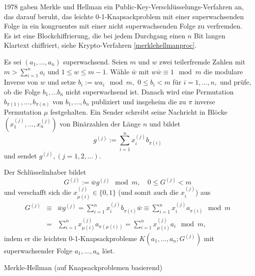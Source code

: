 \begin{refsegment}
1978 gaben Merkle und Hellman \cite{Merkle1978}  ein Public-Key-Verschlüsselungs-Verfahren an, das darauf beruht, das leichte 0-1-Knapsackproblem mit einer superwachsenden Folge in ein kongruentes mit einer nicht superwachsenden Folge zu \glqq verfremden\grqq. Es ist eine Blockchiffrierung, die bei jedem Durchgang einen $n$ Bit langen Klartext chiffriert, siehe Krypto-Verfahren \ref{merklehellmanproc}.

\begin{cryptoprocedure}
Es sei $ (a_1, \dots, a_n) $ superwachsend. Seien $ m $ und $ w $ zwei
teilerfremde Zahlen mit $ m >
\sum_{i=1}^{n} a_i $ und $ 1\leq w \leq m-1. $
Wähle $\bar{w} $ mit $ w \bar{w} \equiv 1 \mod m $ die modulare Inverse
von $ w $ und setze $ b_i:= wa_i \mod m, $ $ 0\leq b_i < m $ für $ i=1,
\dots ,n, $ und prüfe, ob die Folge $ b_1, \dots b_n $ nicht superwachsend
ist. Danach wird eine Permutation $ b_{\pi (1)}, \dots , b_{\pi(n)} $
von $ b_1, \dots , b_n $ publiziert und insgeheim die zu $ \pi $ inverse
Permutation $ \mu $ festgehalten. Ein Sender schreibt seine Nachricht
in Blöcke $ (x_1^{(j)}, \dots, x_n^{(j)}) $ von Binärzahlen der Länge
$ n $ und bildet \[ g^{(j)}:= \sum_{i=1}^n x_{i}^{(j)} b_{\pi(i)} \]
und sendet $ g^{(j)}, (j=1,2, \dots). $\par
Der Schlüsselinhaber bildet
\[ G^{(j)}:=\bar{w} g^{(j)} \mod m ,\quad 0 \leq G^{(j)} < m \]
und verschafft sich die $ x_{\mu(i)}^{(j)} \in \{ 0,1\} $ (und somit auch die $ x_i^{(j)} $) aus
\begin{eqnarray*}
G^{(j)} & \equiv & \bar{w} g^{(j)} = \sum_{i=1}^n x_i^{(j)} b_{\pi (i)} \bar{w} \equiv \sum_{i=1}^n x_i^{(j)} a_{\pi (i)} \mod m\\
& = & \sum_{i=1}^n x_{\mu (i)}^{(j)} a_{\pi (\mu (i))} = \sum _{i=1}^n x_{\mu (i)}^{(j)} a_i \mod m,
\end{eqnarray*}
indem er die leichten 0-1-Knapsackprobleme $ K(a_1,\dots,a_n;G^{(j)}) $ mit superwachsender Folge $ a_1, \dots,a_n $ löst.
\caption{Merkle-Hellman (auf Knapsackproblemen basierend)}
\label{merklehellmanproc}
\end{cryptoprocedure}




\end{refsegment}
